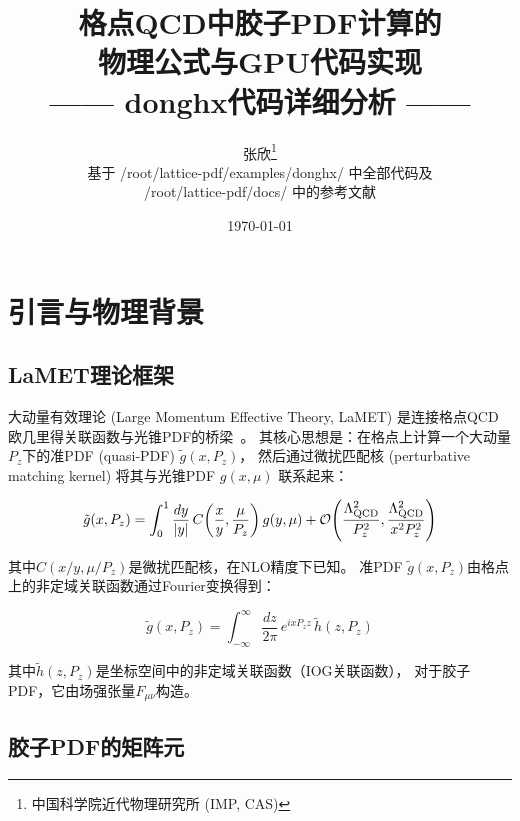 \documentclass[12pt,a4paper]{ctexart}
\title{
    {\Huge \textbf{格点QCD中胶子PDF计算的}}\\[0.3cm]
    {\Huge \textbf{物理公式与GPU代码实现}}\\[0.5cm]
    {\Large —— donghx代码详细分析 ——}
}
\author{
    张欣\thanks{中国科学院近代物理研究所 (IMP, CAS)} \\[0.2cm]
    基于 /root/lattice-pdf/examples/donghx/ 中全部代码及\\
    /root/lattice-pdf/docs/ 中的参考文献
}
\date{\today}
\begin{document}
\maketitle

\tableofcontents
\newpage

\section{引言与物理背景}

\subsection{LaMET理论框架}

大动量有效理论 (Large Momentum Effective Theory, LaMET) 是连接格点QCD欧几里得关联函数与光锥PDF的桥梁~\cite{Ji:2013dva,Ji:2014gla,Ji:2020ect}。
其核心思想是：在格点上计算一个大动量$P_z$下的准PDF (quasi-PDF) $\tilde{g}(x,P_z)$，
然后通过微扰匹配核 (perturbative matching kernel) 将其与光锥PDF $g(x,\mu)$ 联系起来：

\begin{physbox}[LaMET因子化公式]
\begin{equation}
    \tilde{g}(x, P_z) = \int_{0}^{1} \frac{dy}{|y|} \, C\pqty{\frac{x}{y}, \frac{\mu}{P_z}} \, g(y, \mu) + \mathcal{O}\pqty{\frac{\Lambda_{\text{QCD}}^2}{P_z^2}, \frac{\Lambda_{\text{QCD}}^2}{x^2 P_z^2}}
    \label{eq:lamet}
\end{equation}
\end{physbox}

其中$C(x/y, \mu/P_z)$是微扰匹配核，在NLO精度下已知。
准PDF $\tilde{g}(x,P_z)$由格点上的非定域关联函数通过Fourier变换得到：

\begin{physbox}[准PDF的Fourier变换定义]
\begin{equation}
    \tilde{g}(x, P_z) = \int_{-\infty}^{\infty} \frac{dz}{2\pi} \, e^{ixP_z z} \, \tilde{h}(z, P_z)
    \label{eq:quasi_pdf}
\end{equation}
\end{physbox}

其中$\tilde{h}(z, P_z)$是坐标空间中的非定域关联函数（IOG关联函数），
对于胶子PDF，它由场强张量$F_{\mu\nu}$构造。

\subsection{胶子PDF的矩阵元}
\end{document}
